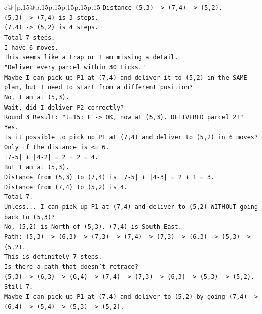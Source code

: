 \documentclass{article}
\begin{document}
{\begin{supertabular}{c@{$\;$}|p{.15\linewidth}@{}p{.15\linewidth}p{.15\linewidth}p{.15\linewidth}p{.15\linewidth}p{.15\linewidth}}
{{{\texttt{Distance (5,3) {-}> (7,4) {-}> (5,2).} \\
\texttt{(5,3) {-}> (7,4) is 3 steps.} \\
\texttt{(7,4) {-}> (5,2) is 4 steps.} \\
\texttt{Total 7 steps.} \\
\texttt{I have 6 moves.} \\
\texttt{This seems like a trap or I am missing a detail.} \\
\texttt{"Deliver every parcel within 30 ticks."} \\
\texttt{Maybe I can pick up P1 at (7,4) and deliver it to (5,2) in the SAME plan, but I need to start from a different position?} \\
\texttt{No, I am at (5,3).} \\
\texttt{Wait, did I deliver P2 correctly?} \\
\texttt{Round 3 Result: "t=15: F {-}> OK, now at (5,3). DELIVERED parcel 2!"} \\
\texttt{Yes.} \\
\texttt{Is it possible to pick up P1 at (7,4) and deliver to (5,2) in 6 moves?} \\
\texttt{Only if the distance is <= 6.} \\
\texttt{|7{-}5| + |4{-}2| = 2 + 2 = 4.} \\
\texttt{But I am at (5,3).} \\
\texttt{Distance from (5,3) to (7,4) is |7{-}5| + |4{-}3| = 2 + 1 = 3.} \\
\texttt{Distance from (7,4) to (5,2) is 4.} \\
\texttt{Total 7.} \\
\texttt{Unless... I can pick up P1 at (7,4) and deliver to (5,2) WITHOUT going back to (5,3)?} \\
\texttt{No, (5,2) is North of (5,3). (7,4) is South{-}East.} \\
\texttt{Path: (5,3) {-}> (6,3) {-}> (7,3) {-}> (7,4) {-}> (7,3) {-}> (6,3) {-}> (5,3) {-}> (5,2).} \\
\texttt{This is definitely 7 steps.} \\
\texttt{Is there a path that doesn't retrace?} \\
\texttt{(5,3) {-}> (6,3) {-}> (6,4) {-}> (7,4) {-}> (7,3) {-}> (6,3) {-}> (5,3) {-}> (5,2).} \\
\texttt{Still 7.} \\
\texttt{Maybe I can pick up P1 at (7,4) and deliver to (5,2) by going (7,4) {-}> (6,4) {-}> (5,4) {-}> (5,3) {-}> (5,2).} \\
}}}
\end{supertabular}}
\end{document}
